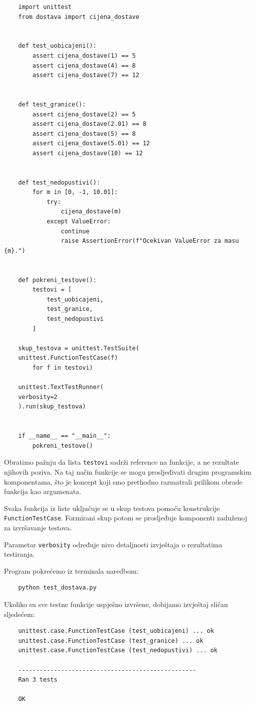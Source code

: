 \begin{verbatim}
	import unittest
	from dostava import cijena_dostave
	
	
	def test_uobicajeni():
	    assert cijena_dostave(1) == 5
	    assert cijena_dostave(4) == 8
	    assert cijena_dostave(7) == 12
	
	
	def test_granice():
	    assert cijena_dostave(2) == 5
	    assert cijena_dostave(2.01) == 8
	    assert cijena_dostave(5) == 8
	    assert cijena_dostave(5.01) == 12
	    assert cijena_dostave(10) == 12
	
	
	def test_nedopustivi():
	    for m in [0, -1, 10.01]:
	        try:
	            cijena_dostave(m)
	        except ValueError:
	            continue
	            raise AssertionError(f"Ocekivan ValueError za masu {m}.")
	
	
	def pokreni_testove():
	    testovi = [
	        test_uobicajeni,
	        test_granice,
	        test_nedopustivi
	    ]
	
	skup_testova = unittest.TestSuite(
	unittest.FunctionTestCase(f)
	    for f in testovi)
	
	unittest.TextTestRunner(
	verbosity=2
	).run(skup_testova)
	
	
	if __name__ == "__main__":
	    pokreni_testove()
\end{verbatim}

Obratimo pažnju da lista \texttt{testovi} sadrži 
reference na funkcije, a ne rezultate njihovih 
poziva. Na taj način funkcije se mogu prosljeđivati 
drugim programskim komponentama, što je koncept 
koji smo prethodno razmatrali prilikom obrade 
funkcija kao argumenata.

Svaka funkcija iz liste uključuje se u skup testova 
pomoću konstrukcije \texttt{FunctionTestCase}. 
Formirani skup potom se prosljeđuje komponenti 
zaduženoj za izvršavanje testova.

Parametar \texttt{verbosity} određuje nivo detaljnosti 
izvještaja o rezultatima testiranja.

Program pokrećemo iz terminala naredbom:

\begin{verbatim}
	python test_dostava.py
\end{verbatim}

Ukoliko su sve testne funkcije uspješno izvršene, 
dobijamo izvještaj sličan sljedećem:

\begin{verbatim}
	unittest.case.FunctionTestCase (test_uobicajeni) ... ok
	unittest.case.FunctionTestCase (test_granice) ... ok
	unittest.case.FunctionTestCase (test_nedopustivi) ... ok
	
	--------------------------------------------------
	Ran 3 tests
	
	OK
\end{verbatim}

